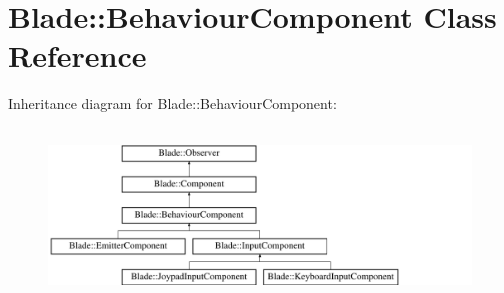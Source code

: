 \hypertarget{class_blade_1_1_behaviour_component}{}\section{Blade\+:\+:Behaviour\+Component Class Reference}
\label{class_blade_1_1_behaviour_component}
Inheritance diagram for Blade\+:\+:Behaviour\+Component\+:\begin{figure}[H]
\begin{center}
\leavevmode
\includegraphics[height=4.597701cm]{class_blade_1_1_behaviour_component}
\end{center}
\end{figure}
